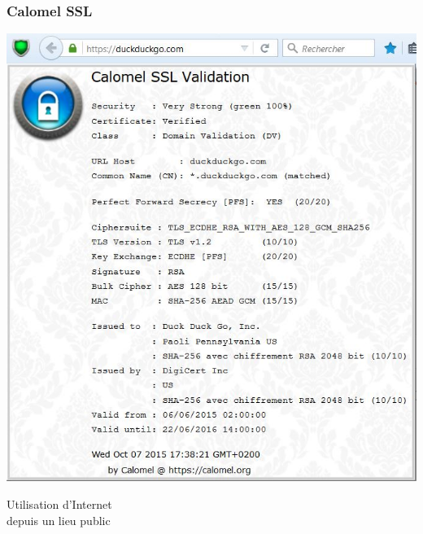 \documentclass{beamer}
\begin{document}
\begin{frame}
\frametitle{Calomel SSL}
\begin{center}
\includegraphics[scale=0.5] {./images/Calomel.jpg}
\end{center}
\end{frame}

\begin{frame}
\begin{center}
\Huge{Utilisation d'Internet \\depuis un lieu public}
\end{center}
\end{frame}
\end{document}
